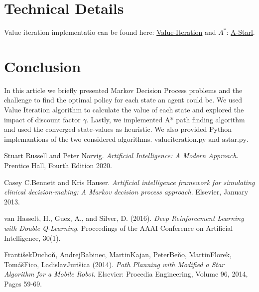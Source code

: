 \documentclass[10pt,a4paper,twocolumn]{article}
\begin{document}
		
	\section{Technical Details}	
	Value iteration implementatio can be found here:
	\href{https://github.com/vassilispapadop/reinforcement-learning/blob/master/src/value_iteration.py}{Value-Iteration}
	and $A^{*}$: \href{https://github.com/vassilispapadop/reinforcement-learning/blob/master/src/a_star.py}{A-Starl}.
	
	\section{Conclusion}
	In this article we briefly presented Markov Decision Process problems and the challenge to find the optimal policy for each state an agent could be. We used Value Iteration algorithm to calculate the value of each state and explored the impact of discount factor $\gamma$. Lastly, we implemented A* path finding algorithm and used the converged state-values as heuristic.
	We also provided Python implemantions of the two considered algorithms. $\text{valueiteration.py and astar.py}$.
		
	
	\begin{thebibliography}{9}
		Stuart Russell and Peter Norvig. 
		\textit{Artificial Intelligence: A Modern Approach}. 
		Prentice Hall, Fourth Edition 2020.
		
		Casey C.Bennett and Kris Hauser. 
		\textit{Artificial intelligence framework for simulating clinical decision-making: A Markov decision process approach}. 
		Elsevier, January 2013.
		
		van Hasselt, H., Guez, A., and Silver, D. (2016). 
		\textit{Deep Reinforcement Learning with Double Q-Learning}. 
		Proceedings of the AAAI Conference on Artificial Intelligence, 30(1). 
		
		FrantišekDuchoň, AndrejBabinec, MartinKajan, PeterBeňo, MartinFlorek, TomášFico, LadislavJurišica (2014). 
		\textit{Path Planning with Modified a Star Algorithm for a Mobile Robot}. 
		Elsevier: Procedia Engineering, Volume 96, 2014, Pages 59-69. 

	\end{thebibliography}
	
\end{document}
